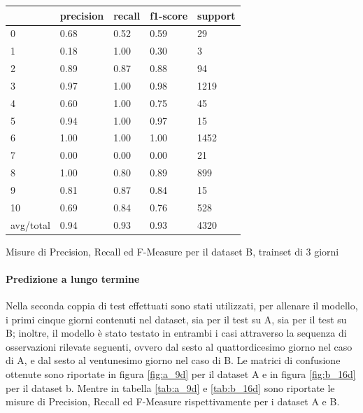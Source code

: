 \documentclass[10pt,a4paper]{article}
\begin{document}
	\begin{table}[!htbp]
    \scriptsize
    \centering
    	\begin{tabularx}{0.56\textwidth}{l | llll}
    		{} & {precision} & {recall} & {f1-score} & {support} \\
    		\midrule
            {0} & {0.68} & {0.52} & {0.59} & {29} \\
            {1} & {0.18} & {1.00} & {0.30} & {3} \\
            {2} & {0.89} & {0.87} & {0.88} & {94} \\
            {3} & {0.97} & {1.00} & {0.98} & {1219} \\
            {4} & {0.60} & {1.00} & {0.75} & {45} \\
            {5} & {0.94} & {1.00} & {0.97} & {15} \\
            {6} & {1.00} & {1.00} & {1.00} & {1452} \\
            {7} & {0.00} & {0.00} & {0.00} & {21} \\
            {8} & {1.00} & {0.80} & {0.89} & {899} \\
            {9} & {0.81} & {0.87} & {0.84} & {15} \\
            {10} & {0.69} & {0.84} & {0.76} & {528} \\
            {avg/total} & {0.94} & {0.93} & {0.93} & {4320} \\
    	\end{tabularx}
    	 {Misure di Precision, Recall ed F-Measure per il dataset B, trainset di 3 giorni}
    	\label{tab:b_3d}
    \end{table}
    

	
	\paragraph{Predizione a lungo termine}
	
	Nella seconda coppia di test effettuati sono stati utilizzati, per allenare il modello, i primi cinque giorni contenuti nel dataset, sia per il test su A, sia per il test su B; inoltre, il modello è stato testato in entrambi i casi attraverso la sequenza di osservazioni rilevate seguenti, ovvero dal sesto al quattordicesimo giorno nel caso di A, e dal sesto al ventunesimo giorno nel caso di B. Le matrici di confusione ottenute sono riportate in figura \ref{fig:a_9d} per il dataset A e in figura \ref{fig:b_16d} per il dataset b. Mentre in tabella \ref{tab:a_9d} e \ref{tab:b_16d} sono riportate le misure di Precision, Recall ed F-Measure rispettivamente per i dataset A e B.
	
\end{document}

